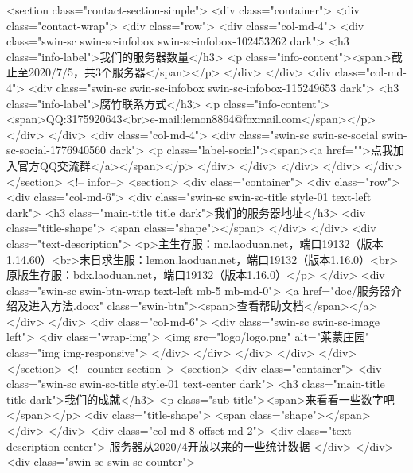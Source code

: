     <section class="contact-section-simple"> 
     <div class="container"> 
      <div class="contact-wrap"> 
       <div class="row"> 
        <div class="col-md-4"> 
         <div class="swin-sc swin-sc-infobox swin-sc-infobox-102453262 dark"> 
          <h3 class="info-label">我们的服务器数量</h3> 
          <p class="info-content"><span>截止至2020/7/5，共3个服务器</span></p> 
         </div> 
        </div> 
        <div class="col-md-4"> 
         <div class="swin-sc swin-sc-infobox swin-sc-infobox-115249653 dark"> 
          <h3 class="info-label">腐竹联系方式</h3> 
          <p class="info-content"><span>QQ:3175920643<br>e-mail:lemon8864@foxmail.com</span></p> 
         </div> 
        </div> 
        <div class="col-md-4"> 
         <div class="swin-sc swin-sc-social swin-sc-social-1776940560 dark"> 
          <p class="label-social"><span><a href="">点我加入官方QQ交流群</a></span></p> 
         </div> 
        </div> 
       </div> 
      </div> 
     </div> 
    </section> 
    <!-- infor--> 
    <section> 
     <div class="container"> 
      <div class="row"> 
       <div class="col-md-6"> 
        <div class="swin-sc swin-sc-title style-01 text-left dark"> 
         <h3 class="main-title title dark">我们的服务器地址</h3> 
         <div class="title-shape">
          <span class="shape"></span>
         </div> 
        </div> 
        <div class="text-description"> 
         <p>主生存服：mc.laoduan.net，端口19132（版本1.14.60）<br>末日求生服：lemon.laoduan.net，端口19132（版本1.16.0）<br>原版生存服：bdx.laoduan.net，端口19132（版本1.16.0）</p> 
        </div> 
        <div class="swin-sc swin-btn-wrap text-left mb-5 mb-md-0">
         <a href="doc/服务器介绍及进入方法.docx" class="swin-btn"><span>查看帮助文档</span></a>
        </div> 
       </div> 
       <div class="col-md-6"> 
        <div class="swin-sc swin-sc-image left"> 
         <div class="wrap-img">
          <img src="logo/logo.png" alt="莱蒙庄园" class="img img-responsive">
         </div> 
        </div> 
       </div> 
      </div> 
     </div> 
    </section> 
    <!-- counter section--> 
    <section> 
     <div class="container"> 
      <div class="swin-sc swin-sc-title style-01 text-center dark"> 
       <h3 class="main-title title dark">我们的成就</h3> 
       <p class="sub-title"><span>来看看一些数字吧</span></p> 
       <div class="title-shape">
        <span class="shape"></span>
       </div> 
      </div> 
      <div class="col-md-8 offset-md-2"> 
       <div class="text-description center">
        服务器从2020/4开放以来的一些统计数据
       </div> 
      </div> 
      <div class="swin-sc swin-sc-counter"> 

